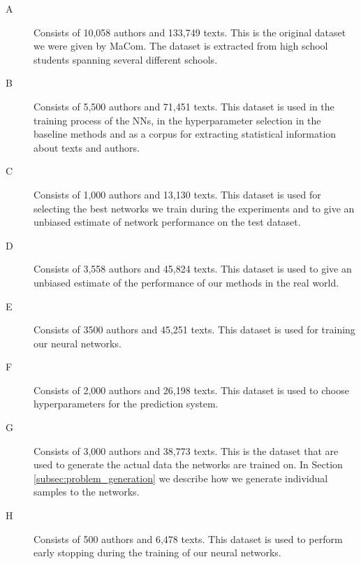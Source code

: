\begin{description}

    \item[\gls{A}]

        Consists of 10,058 authors and 133,749 texts. This is the original
        dataset we were given by MaCom. The dataset is extracted from high
        school students spanning several different schools.

    \item[\gls{B}]

        Consists of 5,500 authors and 71,451 texts. This dataset is used in
        the training process of the \gls{NN}s, in the hyperparameter selection
        in the baseline methods and as a corpus for extracting statistical
        information about texts and authors.

    \item[\gls{C}]

        Consists of 1,000 authors and 13,130 texts. This dataset is used for
        selecting the best networks we train during the experiments and to give
        an unbiased estimate of network performance on the test dataset.

    \item[\gls{D}]

        Consists of 3,558 authors and 45,824 texts. This dataset is used to
        give an unbiased estimate of the performance of our methods in the real
        world.

    \item[\gls{E}]

        Consists of 3500 authors and 45,251 texts. This dataset is used for
        training our neural networks.

    \item[\gls{F}]

        Consists of 2,000 authors and 26,198 texts. This dataset is used to
        choose hyperparameters for the prediction system.

    \item[\gls{G}]

        Consists of 3,000 authors and 38,773 texts. This is the dataset that are
        used to generate the actual data the networks are trained on. In Section
        \ref{subsec:problem_generation} we describe how we generate individual
        samples to the networks.

    \item[\gls{H}]

        Consists of 500 authors and 6,478 texts. This dataset is used to perform
        early stopping during the training of our neural networks.


\end{description}
